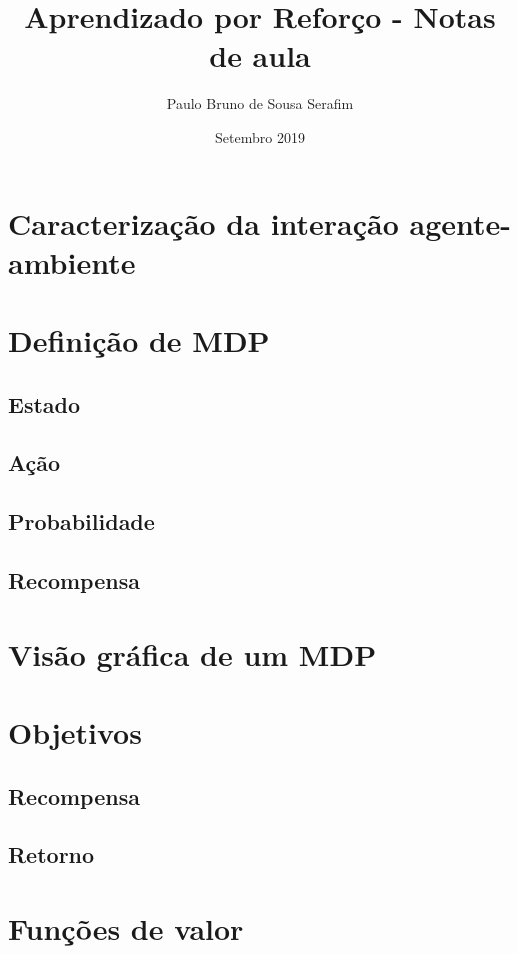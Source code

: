 \documentclass{article}
\title{Aprendizado por Reforço - Notas de aula}
\author{Paulo Bruno de Sousa Serafim}
\date{Setembro 2019}
\begin{document}
\maketitle

\section{Caracterização da interação agente-ambiente}

\section{Definição de MDP}

    \subsection{Estado}
    
    \subsection{Ação}
    
    \subsection{Probabilidade}
    
    \subsection{Recompensa}
    
\section{Visão gráfica de um MDP}

\section{Objetivos}

    \subsection{Recompensa}
    
    \subsection{Retorno}
    
\section{Funções de valor}
\end{document}
